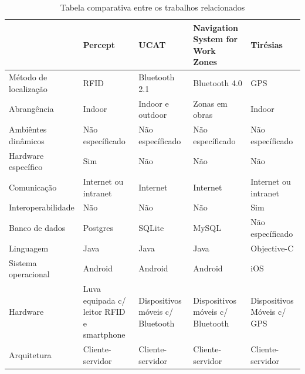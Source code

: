 \documentclass[english,brazilian]{UNISINOSmonografia}
\begin{document}
\FloatBarrier
\begin{table}
	\caption{Tabela comparativa entre os trabalhos relacionados}
	\label{tab:trabalalhosRelacionados}
	\centering%
	\begin{minipage}{1\textwidth}
		\begin{tabular}{ p{3cm} | p{3cm} | p{3cm} | p{3cm} | p{3cm} }
			\hline
										& Percept 									& UCAT 								& Navigation System for Work Zones		& Tirésias   \\ \hline
				Método de localização 	& RFID 										& Bluetooth 2.1 					& Bluetooth 4.0 						& GPS 						 \\ \hline
				Abrangência 			& Indoor 									& Indoor e outdoor 					& Zonas em obras 						& Indoor 					 \\ \hline
				Ambiêntes dinâmicos		& Não específicado							& Não específicado					& Não específicado						& Não específicado			 \\ \hline
				Hardware específico 	& Sim 										& Não 								& Não 									& Não 						 \\ \hline
				Comunicação 			& Internet ou intranet 						& Internet 							& Internet 								& Internet ou intranet 		 \\ \hline
				Interoperabilidade 		& Não 										& Não 								& Não 									& Sim 						 \\ \hline
				Banco de dados 			& Postgres 									& SQLite 							& MySQL 								& Não específicado 			 \\ \hline
				Linguagem 				& Java 										& Java 								& Java 									& Objective-C 				 \\ \hline
				Sistema operacional 	& Android 									& Android 							& Android 								& iOS 						 \\ \hline
				Hardware 				& Luva equipada c/ leitor RFID e smartphone & Dispositivos móveis c/ Bluetooth 	& Dispositivos móveis c/ Bluetooth 		& Dispositivos Móveis c/ GPS \\ \hline
				Arquitetura 			& Cliente-servidor 							& Cliente-servidor 					& Cliente-servidor 						& Cliente-servidor 			 \\ \hline
		\end{tabular}
	\end{minipage}
\end{table}
\FloatBarrier

\end{document}
